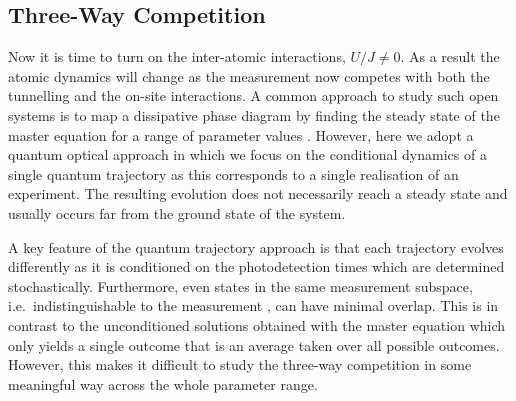 \subsection{Three-Way Competition}

Now it is time to turn on the inter-atomic interactions, $U/J \ne
0$. As a result the atomic dynamics will change as the measurement now
competes with both the tunnelling and the on-site interactions. A
common approach to study such open systems is to map a dissipative
phase diagram by finding the steady state of the master equation for a
range of parameter values \cite{kessler2012}. However, here we adopt a
quantum optical approach in which we focus on the conditional dynamics
of a single quantum trajectory as this corresponds to a single
realisation of an experiment. The resulting evolution does not
necessarily reach a steady state and usually occurs far from the
ground state of the system.

A key feature of the quantum trajectory approach is that each
trajectory evolves differently as it is conditioned on the
photodetection times which are determined stochastically. Furthermore,
even states in the same measurement subspace, i.e.~indistinguishable
to the measurement , can have minimal overlap. This is in contrast to
the unconditioned solutions obtained with the master equation which
only yields a single outcome that is an average taken over all
possible outcomes. However, this makes it difficult to study the
three-way competition in some meaningful way across the whole
parameter range.

